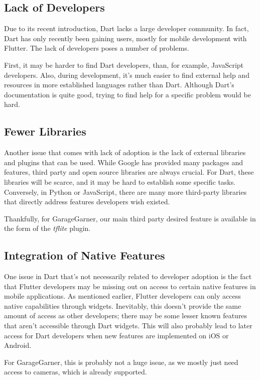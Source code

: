 \subsection{Lack of Developers}
Due to its recent introduction, Dart lacks a large developer community. In fact, Dart has only recently been gaining users, mostly for mobile development with
Flutter. The lack of developers poses a number of problems.

First, it may be harder to find Dart developers, than, for example, JavaScript developers. Also, during development, it's much easier to find external help and resources in more established languages rather than Dart. Although
Dart's documentation is quite good, trying to find help for a specific problem would be hard.

\subsection{Fewer Libraries}

Another issue that comes with lack of adoption is the lack of external libraries and plugins that can be used. While Google has provided
many packages and features, third party and open source libraries are always crucial. For Dart, these libraries will be scarce, and 
it may be hard to establish some specific tasks. Conversely, in Python or JavaScript, there are many more third-party libraries that directly
address features developers wish existed. 

Thankfully, for GarageGarner, our main third party desired feature is available in the form of the \emph{tflite} plugin.

\subsection{Integration of Native Features}

One issue in Dart that's not necessarily related to developer adoption is the fact that Flutter developers may be missing 
out on access to certain native features in mobile applications. As mentioned earlier, Flutter developers can only access native capabilities through 
widgets. Inevitably, this doesn't provide the same amount of access as other developers; there
may be some lesser known features that aren't accessible through Dart widgets. This will also probably lead to 
later access for Dart developers when new features are implemented on iOS or Android.

For GarageGarner, this is probably not a huge issue, as we mostly just need access to cameras, which is already supported. 

